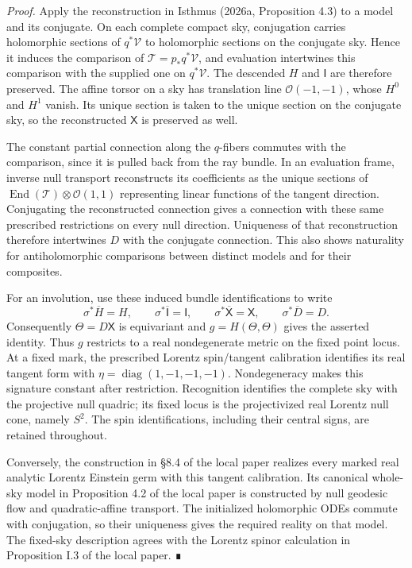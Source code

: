 \documentclass[
  english,
  11pt,
  reqno]{amsart}
\begin{document}
\emph{Proof.} Apply the reconstruction in Isthmus (2026a, Proposition
4.3) to a model and its conjugate. On each complete compact sky,
conjugation carries holomorphic sections of \(q^*\mathcal V\) to
holomorphic sections on the conjugate sky. Hence it induces the
comparison of \(\mathcal T=p_*q^*\mathcal V\), and evaluation
intertwines this comparison with the supplied one on \(q^*\mathcal V\).
The descended \(H\) and \(\mathsf I\) are therefore preserved. The
affine torsor on a sky has translation line \(\mathcal O(-1,-1)\), whose
\(H^0\) and \(H^1\) vanish. Its unique section is taken to the unique
section on the conjugate sky, so the reconstructed \(\mathsf X\) is
preserved as well.

The constant partial connection along the \(q\)-fibers commutes with the
comparison, since it is pulled back from the ray bundle. In an
evaluation frame, inverse null transport reconstructs its coefficients
as the unique sections of
\(\operatorname{End}(\mathcal T)\otimes\mathcal O(1,1)\) representing
linear functions of the tangent direction. Conjugating the reconstructed
connection gives a connection with these same prescribed restrictions on
every null direction. Uniqueness of that reconstruction therefore
intertwines \(D\) with the conjugate connection. This also shows
naturality for antiholomorphic comparisons between distinct models and
for their composites.

For an involution, use these induced bundle identifications to write \[
\sigma^*\overline H=H,\qquad
\sigma^*\overline{\mathsf I}=\mathsf I,\qquad
\sigma^*\overline{\mathsf X}=\mathsf X,\qquad
\sigma^*\overline D=D.
\] Consequently \(\Theta=D\mathsf X\) is equivariant and
\(g=H(\Theta,\Theta)\) gives the asserted identity. Thus \(g\) restricts
to a real nondegenerate metric on the fixed point locus. At a fixed
mark, the prescribed Lorentz spin/tangent calibration identifies its
real tangent form with \(\eta=\operatorname{diag}(1,-1,-1,-1)\).
Nondegeneracy makes this signature constant after restriction.
Recognition identifies the complete sky with the projective null
quadric; its fixed locus is the projectivized real Lorentz null cone,
namely \(S^2\). The spin identifications, including their central signs,
are retained throughout.

Conversely, the construction in §8.4 of the local paper realizes every
marked real analytic Lorentz Einstein germ with this tangent
calibration. Its canonical whole-sky model in Proposition 4.2 of the
local paper is constructed by null geodesic flow and quadratic-affine
transport. The initialized holomorphic ODEs commute with conjugation, so
their uniqueness gives the required reality on that model. The fixed-sky
description agrees with the Lorentz spinor calculation in Proposition
I.3 of the local paper. ∎
\end{document}
